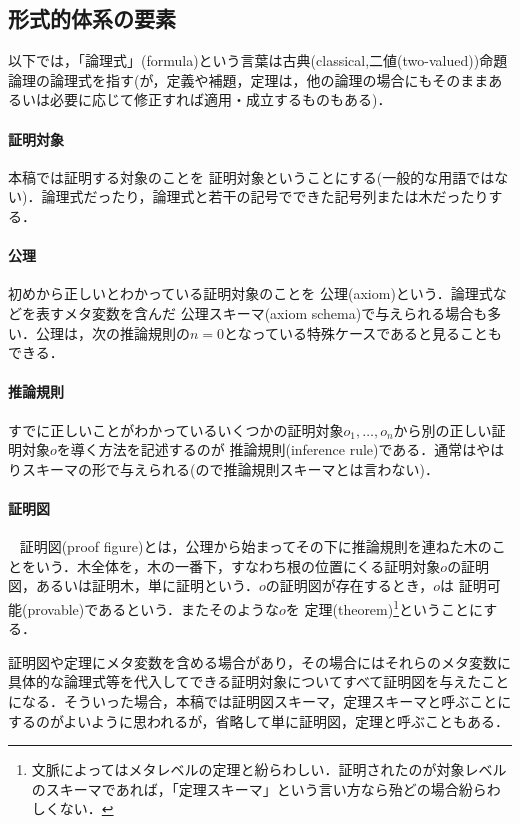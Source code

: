 \documentclass{ltjsarticle}
\theoremstyle{mystyle1}
\theoremstyle{mystyle3}
\theoremstyle{mystyle2}
\newcommand{\red}[1]{{\color{red} #1}}
\begin{document}
\subsection{形式的体系の要素}
以下では，「論理式」(formula)という言葉は古典(classical,二値(two-valued))命題論理の論理式を指す(が，定義や補題，定理は，他の論理の場合にもそのままあるいは必要に応じて修正すれば適用・成立するものもある)．
\paragraph{証明対象}
本稿では証明する対象のことを\red{証明対象}ということにする(一般的な用語ではない)．論理式だったり，論理式と若干の記号でできた記号列または木だったりする．
\paragraph{公理}
初めから正しいとわかっている証明対象のことを\red{公理}(axiom)という．論理式などを表すメタ変数を含んだ\red{公理スキーマ}(axiom schema)で与えられる場合も多い．公理は，次の推論規則の$n =0$となっている特殊ケースであると見ることもできる．
\paragraph{推論規則}
すでに正しいことがわかっているいくつかの証明対象$o_1,\ldots,o_n$から別の正しい証明対象$o$を導く方法を記述するのが\red{推論規則}(inference rule)である．通常はやはりスキーマの形で与えられる(ので推論規則スキーマとは言わない)．
\begin{prooftree}
\end{prooftree}

\paragraph{証明図}
\ \red{証明図}(proof figure)とは，公理から始まってその下に推論規則を連ねた木のことをいう．木全体を，木の一番下，すなわち根の位置にくる証明対象$o$の証明図，あるいは証明木，単に証明という．$o$の証明図が存在するとき，$o$は\red{証明可能}(provable)であるという．またそのような$o$を\red{定理}(theorem)\footnote{文脈によってはメタレベルの定理と紛らわしい．証明されたのが対象レベルのスキーマであれば，「定理スキーマ」という言い方なら殆どの場合紛らわしくない．}ということにする．

証明図や定理にメタ変数を含める場合があり，その場合にはそれらのメタ変数に具体的な論理式等を代入してできる証明対象についてすべて証明図を与えたことになる．そういった場合，本稿では証明図スキーマ，定理スキーマと呼ぶことにするのがよいように思われるが，省略して単に証明図，定理と呼ぶこともある．
\end{document}
